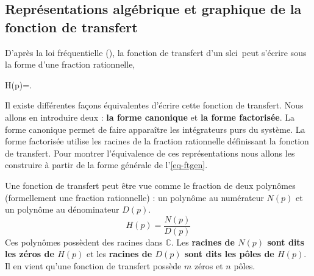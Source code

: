 \subsection
[Représentation de la fonction de transfert]
{Représentations algébrique et graphique de la fonction de transfert}
D'après la loi fréquentielle (), la fonction de transfert 
d'un \gls{slci}~peut s'écrire sous la forme d'une fraction rationnelle,
\begin{bequation}
H(p)=. 
\label{eq-ftgen}
\end{bequation}
Il existe différentes façons équivalentes d'écrire cette fonction de transfert.
Nous allons en introduire deux :
\textbf{la forme canonique} et \textbf{la forme factorisée}. La forme canonique 
permet de faire apparaître les intégrateurs purs du système. La forme 
factorisée utilise les racines de la fraction rationnelle définissant la 
fonction de transfert. Pour montrer l'équivalence de ces représentations 
nous allons les construire à partir de la forme générale de l'\cref{eq-ftgen}.

Une fonction de transfert peut être vue comme le fraction de deux polynômes 
(formellement une fraction rationnelle) : un polynôme au numérateur $N(p)$ 
et un polynôme au dénominateur $D(p)$.
\[
    H(p)=\dfrac{N(p)}{D(p)}
\]
Ces polynômes possèdent des racines dans $\mathbb{C}$. Les 
\textbf{racines de $N(p)$ sont dits les zéros de $H(p)$} et 
les \textbf{racines de $D(p)$ sont dits les pôles de $H(p)$}.
Il en vient qu'une fonction de transfert possède $m$ zéros et $n$ pôles.

